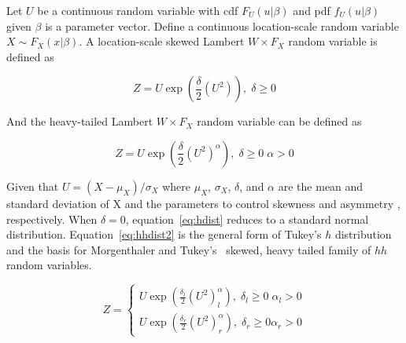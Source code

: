\documentclass[12pt]{article}\usepackage[]{graphicx}\usepackage[]{color}
\theoremstyle{definition}
\begin{document}
Let $U$ be a continuous random variable with cdf $F_U(u|\beta)$ and pdf $f_U(u|\beta)$ given $\beta$ is a parameter vector. Define a continuous location-scale random variable $X\sim F_X(x|\beta)$. A location-scale skewed Lambert $W\times F_X$ random variable is defined as

\begin{equation}
Z = U\exp \left(\frac{\delta}{2} (U^2)\right),\; \delta\ge 0
\label{eq:hdist}
\end{equation}

And the heavy-tailed Lambert $W\times F_X$ random variable can be defined as

\begin{equation}
Z = U\exp\left(\frac{\delta}{2}(U^2)^\alpha\right),\; \delta\ge 0\; \alpha > 0
\label{eq:hhdist2}
\end{equation}

Given that $U = (X-\mu_X)/\sigma_X$ where $\mu_X$, $\sigma_X$, $\delta$, and $\alpha$ are the mean and standard deviation of X and the parameters to control skewness and asymmetry , respectively. When $\delta = 0$, equation~\ref{eq:hdist} reduces to a standard normal distribution. Equation~\ref{eq:hhdist2} is the general form of Tukey's $h$ distribution~\cite{ghdist} and the basis for Morgenthaler and Tukey's~\cite{hhdist} skewed, heavy tailed family of $hh$ random variables.

\begin{equation}
  Z = \begin{cases}
               U\exp\left(\frac{\delta_l}{2}(U^2)^\alpha_l\right),\; \delta_l \ge 0\; \alpha_l > 0\\
               U\exp\left(\frac{\delta_r}{2}(U^2)^\alpha_r\right),\; \delta_r \ge 0 \alpha_r > 0
            \end{cases}
\end{equation}

\singlespacing
\end{document}
